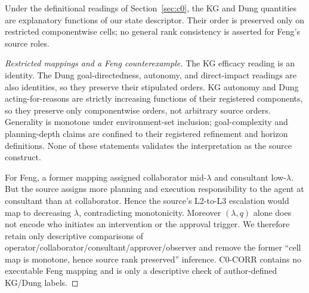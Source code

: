 \begin{proposition}
Under the definitional readings of Section~\ref{sec:c0}, the KG and Dung
quantities are explanatory functions of our state descriptor. Their order is
preserved only on restricted componentwise cells; no general rank consistency
is asserted for Feng's source roles.
\end{proposition}
\begin{proof}[Restricted mappings and a Feng counterexample]
The KG efficacy reading is an identity. The Dung goal-directedness, autonomy,
and direct-impact readings are also identities, so they preserve their
stipulated orders. KG autonomy and Dung acting-for-reasons are strictly
increasing functions of their registered components, so they preserve only
componentwise orders, not arbitrary source orders. Generality is monotone under environment-set inclusion; goal-complexity
and planning-depth claims are confined to their registered refinement and
horizon definitions. None of these statements validates the interpretation as
the source construct.

For Feng, a former mapping assigned collaborator mid-$\lambda$ and consultant
low-$\lambda$. But the source assigns more planning and execution
responsibility to the agent at consultant than at collaborator. Hence the
source's L2-to-L3 escalation would map to decreasing $\lambda$, contradicting
monotonicity. Moreover $(\lambda,q)$ alone does not encode who initiates an
intervention or the approval trigger. We therefore retain only descriptive
comparisons of operator/collaborator/consultant/approver/observer and remove
the former ``cell map is monotone, hence source rank preserved'' inference.
C0-CORR contains no executable Feng mapping and is only a descriptive check
of author-defined KG/Dung labels.
\end{proof}

